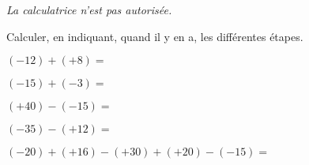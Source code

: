 \begin{minipage}{0.99\linewidth}

\exo

\emph{La calculatrice n'est pas autorisée.}


Calculer, en indiquant, quand il y en a, les différentes étapes. 

\begin{enumerate}

\begin{multicols}{2}

\item $ (-12)+(+8)= $

\item $ (-15)+(-3)= $

\item $ (+40)-(-15)= $

\item $ (-35)-(+12)= $

\item $ (-20)+(+16)-(+30)+(+20)-(-15) = $

\end{multicols}

\end{enumerate}

\end{minipage}

\vspace{0.5cm}
